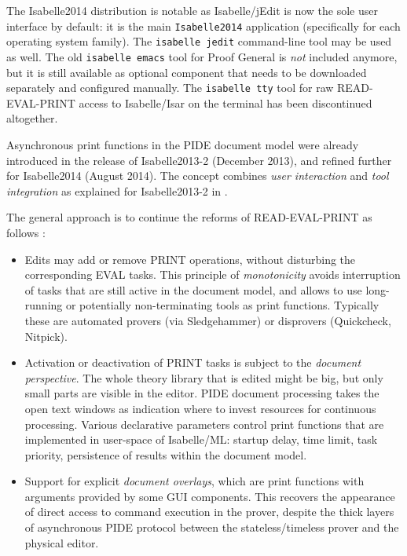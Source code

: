 \begin{isabellebody}
\begin{isamarkuptext}
The Isabelle2014 distribution is notable as Isabelle/jEdit is now the sole
user interface by default: it is the main \verb|Isabelle2014|
application (specifically for each operating system family). The \verb|isabelle jedit| command-line tool may be used as well. The old \verb|isabelle emacs| tool for Proof General is \emph{not} included anymore, but
it is still available as optional component that needs to be downloaded
separately and configured manually. The \verb|isabelle tty| tool for
raw READ-EVAL-PRINT access to Isabelle/Isar on the terminal has been
discontinued altogether.%
\end{isamarkuptext}%
\isamarkuptrue%
%
\isamarkuptrue%
%
\begin{isamarkuptext}%
Asynchronous print functions in the PIDE document model were already
introduced in the release of Isabelle2013-2 (December 2013), and refined
further for Isabelle2014 (August 2014). The concept combines \emph{user
interaction} and \emph{tool integration} as explained for Isabelle2013-2 in
\cite{Wenzel:2014:ITP-PIDE}.

The general approach is to continue the reforms of READ-EVAL-PRINT
\cite{Wenzel:2012:UITP-EPTCS} as follows \cite[\S5]{Wenzel:2014:ITP-PIDE}:

\begin{itemize}

\item Edits may add or remove PRINT operations, without disturbing the
corresponding EVAL tasks. This principle of \emph{monotonicity} avoids
interruption of tasks that are still active in the document model, and
allows to use long-running or potentially non-terminating tools as print
functions. Typically these are automated provers (via Sledgehammer) or
disprovers (Quickcheck, Nitpick).

\item Activation or deactivation of PRINT tasks is subject to the
\emph{document perspective}. The whole theory library that is edited might
be big, but only small parts are visible in the editor. PIDE document
processing takes the open text windows as indication where to invest
resources for continuous processing. Various declarative parameters control
print functions that are implemented in user-space of Isabelle/ML: startup
delay, time limit, task priority, persistence of results within the document
model.

\item Support for explicit \emph{document overlays}, which are print
functions with arguments provided by some GUI components. This recovers the
appearance of direct access to command execution in the prover, despite the
thick layers of asynchronous PIDE protocol between the stateless/timeless
prover and the physical editor.


\end{itemize}
\end{isamarkuptext}
\end{isabellebody}
